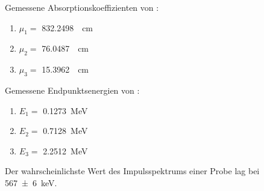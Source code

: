\documentclass[12pt,english,ngerman]{scrartcl}
\begin{document}
Gemessene Absorptionskoeffizienten von :
\begin{enumerate}
	\item $\mu_1 = $ \SI{832.2498}{\per\cm}
	\item $\mu_2 = $ \SI{76.0487}{\per\cm}
	\item $\mu_3 = $ \SI{15.3962}{\per\cm}
\end{enumerate}

Gemessene Endpunktsenergien von :
\begin{enumerate}
	\item $E_1 = $ \SI{0.1273}{\mega\electronvolt}
	\item $E_2 = $ \SI{0.7128}{\mega\electronvolt}
	\item $E_3 = $ \SI{2.2512}{\mega\electronvolt}
\end{enumerate}

Der wahrscheinlichste Wert des Impulsspektrums einer  Probe
lag bei \SI{567(6)}{\kilo\electronvolt}.
\end{document}
